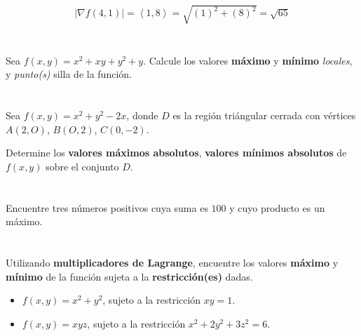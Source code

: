 \documentclass[12pt]{article}
\begin{document}
\begin{align*}
  |\nabla f (4,1)| = \left\langle  1,8 \right\rangle = \sqrt{(1)^2+(8)^2} = \sqrt{65}
\end{align*}


\section{}

Sea $f(x, y) = x^2 + xy + y^2 + y$. Calcule los valores \textbf{máximo} y \textbf{mínimo} \textit{locales}, y \textit{punto(s)} silla de la función.

\section{}

Sea $f(x, y) = x^2 + y^2 − 2x$, donde $D$ es la región triángular cerrada con vértices $A(2, O)$, $B(O, 2)$, $C(0, -2)$.

Determine los \textbf{valores máximos absolutos}, \textbf{valores mínimos absolutos} de $f(x, y)$ sobre el conjunto $D$.

\section{}

Encuentre tres números positivos cuya suma es $100$ y cuyo producto es un máximo.

\section{}

Utilizando \textbf{multiplicadores de Lagrange}, encuentre los valores \textbf{máximo} y \textbf{mínimo} de la función sujeta a la \textbf{restricción(es)} dadas.

\begin{itemize}[format=\textbf]

\item $f(x, y) = x^2 + y^2$, sujeto a la restricción $xy = 1$.

\item $f(x, y) = xyz$, sujeto a la restricción $x^2 + 2y^2 + 3z^2 = 6$.
  
\end{itemize}
\end{document}
